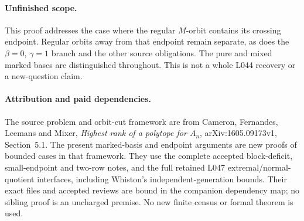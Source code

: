 \documentclass[11pt,a4paper]{article}
\begin{document}
\paragraph{Unfinished scope.}
This proof addresses the case where the regular
$M$-orbit contains its crossing endpoint. Regular
orbits away from that endpoint remain separate, as
does the $\beta=0$, $\gamma=1$ branch and the other
source obligations. The pure and mixed marked bases
are distinguished throughout. This is not a whole
L044 recovery or a new-question claim.
\paragraph{Attribution and paid dependencies.}
The source problem and orbit-cut framework are from Cameron, Fernandes,
Leemans and Mixer, \emph{Highest rank of a polytope for $A_n$},
arXiv:1605.09173v1, Section~5.1. The present marked-basis and endpoint
arguments are new proofs of bounded cases in that framework. They use
the complete accepted block-deficit, small-endpoint and two-row notes,
and the full retained L047 extremal/normal-quotient interfaces, including
Whiston's independent-generation bounds. Their exact files and accepted
reviews are bound in the companion dependency map; no sibling proof is
an uncharged premise. No new finite census or formal theorem is used.
\end{document}
